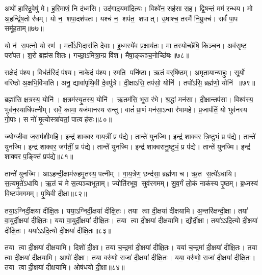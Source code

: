 अथो॑ हारिद्र॒वेषु॑ मे।
ह॒रि॒माणं॒ नि द॑ध्मसि।
उद॑गाद॒यमा॑दि॒त्यः।
विश्वे॑न॒ सह॑सा स॒ह।
द्वि॒षन्तं॒ मम॑ र॒न्धय\sn{}।
मो अ॒हन्द्वि॑ष॒तो र॑धम्।
यो न॒ शपा॒दश॑पतः।
यश्च॑ न॒ शप॑त॒ शपात्।
उ॒षाश्च॒ तस्मै॑ नि॒म्रुक्च॑।
सर्वं॑ पा॒प समू॑हताम्॥७७॥

यो न॑ स॒पत्नो॒ यो रण॑।
मर्तो॑ऽभि॒दास॑ति देवाः।
इ॒ध्मस्ये॑व प्र॒क्षाय॑तः।
मा तस्योच्छे॑षि॒ किञ्च॒न।
अव॑सृष्ट॒ परा॑पत।
श॒रो ब्रह्म॑सशितः।
गच्छा॒ऽमित्रा॒न्प्र वि॑श।
मैषा॒ङ्कञ्च॒नोच्छि॑षः॥७८॥\anuvakamend[पति॑ प्र॒जाप॑तये तप॒स्वी वा॒चा सौभ॑गाय प॒शून्मे॑ पिन्वस्व दुर्मरा॒युं दे॑व॒याना॑नग्ने॒ऽन्तरि॑क्षे॒ऽहमुत्त॑रो भूयासं प्र॒जाप॑तिरसि स॒र्वत॑ श्रि॒तः प्रवि॑ष्टन्दे॒वता॑भिर्वाज॒जितं॑ पृथि॒वी ह्व॑यताम॒ग्निराग्नीध्राद्वृश्चत ससृ॒वास हु॒ते स्यो॒नेन॑ मे॒ सन्ति॑ष्ठस्वे॒तः कृ॑धि दध्मस्यूहताम॒ष्टौ च॑]

सक्षे॒दं प॑श्य।
विध॑र्तरि॒दं प॑श्य।
नाके॒दं प॑श्य।
र॒मति॒ पनि॑ष्ठा।
ऋ॒तं वर्‌षि॑ष्ठम्।
अ॒मृता॒यान्या॒हुः।
सूर्यो॒ वरि॑ष्ठो अ॒क्षभि॒र्विभा॑ति।
अनु॒ द्यावा॑पृथि॒वी दे॒वपु॑त्रे।
दी॒क्षाऽसि॒ तप॑सो॒ योनि॑।
तपो॑ऽसि॒ ब्रह्म॑णो॒ योनि॑ ॥७९॥

ब्रह्मा॑सि क्ष॒त्रस्य॒ योनि॑।
क्ष॒त्रम॑स्यृ॒तस्य॒ योनि॑।
ऋ॒तम॑सि॒ भूरा र॑भे।
श्र॒द्धां मन॑सा।
दी॒क्षान्तप॑सा।
विश्व॑स्य॒ भुव॑न॒स्याधि॑पत्नीम्।
सर्वे॒ कामा॒ यज॑मानस्य सन्तु।
वातं॑ प्रा॒णं मन॑सा॒ऽन्वा र॑भामहे।
प्र॒जाप॑तिं॒ यो भुव॑नस्य गो॒पाः।
स नो॑ मृ॒त्योस्त्रा॑यतां॒ पात्वह॑सः॥८०॥

ज्योग्जी॒वा ज॒राम॑शीमहि।
इन्द्र॑ शाक्वर गाय॒त्रीं प्र प॑द्ये।
तान्ते॑ युनज्मि।
इन्द्र॑ शाक्वर त्रि॒ष्टुभं॒ प्र प॑द्ये।
तान्ते॑ युनज्मि।
इन्द्र॑ शाक्वर॒ जग॑तीं॒ प्र प॑द्ये।
तान्ते॑ युनज्मि।
इन्द्र॑ शाक्वरानु॒ष्टुभं॒ प्र प॑द्ये।
तान्ते॑ युनज्मि।
इन्द्र॑ शाक्वर प॒ङ्क्तिं प्रप॑द्ये॥८१॥

तान्ते॑ युनज्मि।
आऽहन्दी॒क्षाम॑रुहमृ॒तस्य॒ पत्नीम्।
गा॒य॒त्रेण॒ छन्द॑सा॒ ब्रह्म॑णा च।
ऋ॒त स॒त्ये॑ऽधायि।
स॒त्यमृ॒ते॑ऽधायि।
ऋ॒तं च॑ मे स॒त्यञ्चा॑भूताम्।
ज्योति॑रभूव॒ सुव॑रगमम्।
सु॒व॒र्गं लो॒कं नाक॑स्य पृ॒ष्ठम्।
ब्र॒ध्नस्य॑ वि॒ष्टप॑मगमम्।
पृ॒थि॒वी दी॒क्षा॥८२॥

तया॒ऽग्निर्दी॒क्षया॑ दीक्षि॒तः।
यया॒ऽग्निर्दी॒क्षया॑ दीक्षि॒तः।
तया त्वा दी॒क्षया॑ दीक्षयामि।
अ॒न्तरि॑क्षन्दी॒क्षा।
तया॑ वा॒युर्दी॒क्षया॑ दीक्षि॒तः।
यया॑ वा॒युर्दी॒क्षया॑ दीक्षि॒तः।
तया त्वा दी॒क्षया॑ दीक्षयामि।
द्यौर्दी॒क्षा।
तया॑ऽऽदि॒त्यो दी॒क्षया॑ दीक्षि॒तः।
यया॑ऽऽदि॒त्यो दी॒क्षया॑ दीक्षि॒तः॥८३॥

तया त्वा दी॒क्षया॑ दीक्षयामि।
दिशो॑ दी॒क्षा।
तया॑ च॒न्द्रमा॑ दी॒क्षया॑ दीक्षि॒तः।
यया॑ च॒न्द्रमा॑ दी॒क्षया॑ दीक्षि॒तः।
तया त्वा दी॒क्षया॑ दीक्षयामि।
आपो॑ दी॒क्षा।
तया॒ वरु॑णो॒ राजा॑ दी॒क्षया॑ दीक्षि॒तः।
यया॒ वरु॑णो॒ राजा॑ दी॒क्षया॑ दीक्षि॒तः।
तया त्वा दी॒क्षया॑ दीक्षयामि।
ओष॑धयो दी॒क्षा॥८४॥

